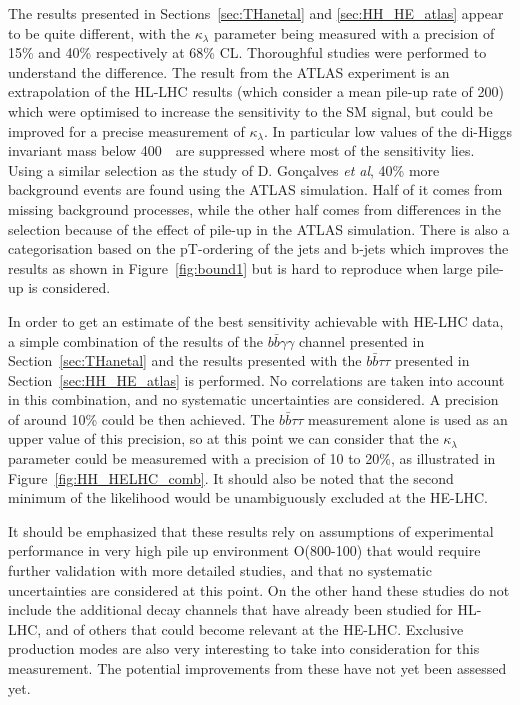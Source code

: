 The results presented in Sections~\ref{sec:THanetal} and \ref{sec:HH_HE_atlas} appear to be quite different, with the $\kappa_{\lambda}$ parameter being measured with a precision of 15\% and 40\% respectively at 68\% CL.
Thoroughful studies were performed to understand the difference. The result from the ATLAS experiment is an extrapolation of the HL-LHC results (which consider a mean pile-up rate of 200) which were optimised to increase the sensitivity to the SM signal, but could be improved for a precise measurement of $\kappa_{\lambda}$. In particular low values of the di-Higgs invariant mass below 400~\GeV\ are suppressed where most of the sensitivity lies.
Using a similar selection as the study of D. Gon\c{c}alves \textit{et al}, 40\% more background events are found using the ATLAS simulation. Half of it comes from missing background processes, while the other half comes from differences in the selection because of the effect of pile-up in the ATLAS simulation.
There is also a categorisation based on the pT-ordering of the jets and b-jets which improves the results as shown in Figure~\ref{fig:bound1} but is hard to reproduce when large pile-up is considered.


In order to get an estimate of the best sensitivity achievable with HE-LHC data, a simple combination of the results of the $b\bar{b}\gamma\gamma$ channel presented in Section~\ref{sec:THanetal} and the results presented with the $b\bar{b}\tau\tau$ presented in Section~\ref{sec:HH_HE_atlas} is performed. No correlations are taken into account in this combination, and no systematic uncertainties are considered. A precision of around 10\% could be then achieved. The $b\bar{b}\tau\tau$ measurement alone is used as an upper value of this precision, so at this point we can consider that the $\kappa_{\lambda}$ parameter could be measuremed with a precision of 10 to 20\%, as illustrated in Figure~\ref{fig:HH_HELHC_comb}. It should also be noted that the second minimum of the likelihood would be unambiguously excluded at the HE-LHC.

It should be emphasized that these results rely on assumptions of experimental performance in very high pile up environment O(800-100) that would require further validation with more detailed studies, and that no systematic uncertainties are considered at this point. On the other hand these studies do not include the additional decay channels that have already been studied for HL-LHC, and of others that could become relevant at the HE-LHC. Exclusive production modes are also very interesting to take into consideration for this measurement. The potential improvements from these have not yet been assessed yet.


